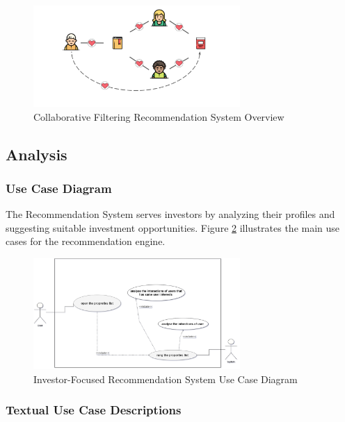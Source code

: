 \begin{figure}[htbp]
    \centering
    \includegraphics[width=0.7\textwidth]{images/collaborative_filtring.png}
    \caption{Collaborative Filtering Recommendation System Overview}
    \label{fig:collaborative-filtering-overview}
\end{figure}

\subsection{Analysis}
\subsubsection{Use Case Diagram}
The Recommendation System serves investors by analyzing their profiles and suggesting suitable investment opportunities. Figure \ref{fig:recommendation-use-case} illustrates the main use cases for the recommendation engine.

\begin{figure}[htbp]
    \centering
    \includegraphics[width=0.7\textwidth]{images/recommendation_use_case_diagram.png}
    \caption{Investor-Focused Recommendation System Use Case Diagram}
    \label{fig:recommendation-use-case}
\end{figure}

\newpage
\subsubsection{Textual Use Case Descriptions}

